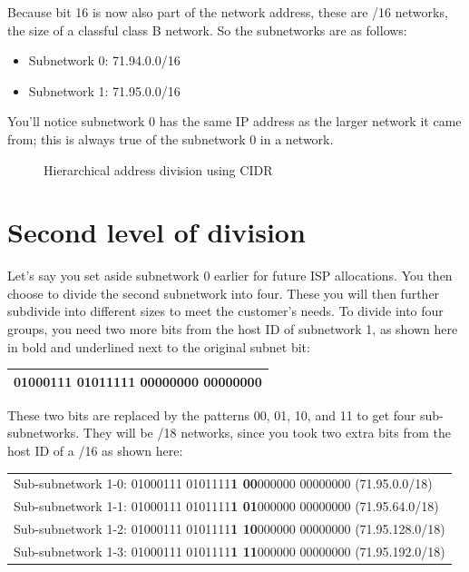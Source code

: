 Because bit 16 is now also part of the network address, these are /16 networks, the size of a classful class B network.
So the subnetworks are as follows:
\begin{itemize}
   \item Subnetwork 0: 71.94.0.0/16
   \item Subnetwork 1: 71.95.0.0/16
\end{itemize}
You'll notice subnetwork 0 has the same IP address as the larger network it came from; this is always true of the subnetwork 0 in a network.


\begin{figure}
   \centering
   \caption{Hierarchical address division using CIDR}
   \label{fig:cidr-hierarchical-division}
\end{figure}


\section{Second level of division}

Let's say you set aside subnetwork 0 earlier for future ISP allocations.
You then choose to divide the second subnetwork into four.
These you will then further subdivide into different sizes to meet the customer's needs.
To divide into four groups, you need two more bits from the host ID of subnetwork 1, as shown here in bold and underlined next to the original subnet bit:

\begin{longtable}[]{@{}l@{}}
\toprule
\endhead
01000111 0101111{\textbf{1 {00}}}000000 00000000\tabularnewline
\bottomrule
\end{longtable}

These two bits are replaced by the patterns 00, 01, 10, and 11 to get
four sub-subnetworks. They will be /18 networks, since you took two
extra bits from the host ID of a /16 as shown here:

\begin{longtable}[]{@{}l@{}}
\toprule
\endhead
Sub-subnetwork 1-0: 01000111 0101111{\textbf{1 {00}}}000000 00000000
(71.95.0.0/18)\tabularnewline
Sub-subnetwork 1-1: 01000111 0101111{\textbf{1 {01}}}000000 00000000
(71.95.64.0/18)\tabularnewline
Sub-subnetwork 1-2: 01000111 0101111{\textbf{1 {10}}}000000 00000000
(71.95.128.0/18)\tabularnewline
Sub-subnetwork 1-3: 01000111 0101111{\textbf{1 {11}}}000000 00000000
(71.95.192.0/18)\tabularnewline
\bottomrule
\end{longtable}

